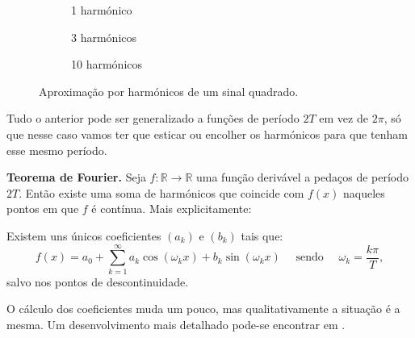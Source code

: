\begin{figure}[h]
\begin{figurebox}
    \vspace{10pt}
    \centering
      \begin{subfigure}{.3\textwidth}
          \centering
          \scalebox{0.25}{ }
          \caption{1 harmónico}
          \label{fig:0a} 
      \end{subfigure} %
      \begin{subfigure}{.3\textwidth}
          \centering
          \scalebox{0.25}{}
          \caption{3 harmónicos}
          \label{fig:0b}
      \end{subfigure} %
      \begin{subfigure}{.3\textwidth}
          \centering
          \scalebox{0.25}{}
          \caption{10 harmónicos}
          \label{fig:0c}
      \end{subfigure}
      \caption{Aproximação por harmónicos de um sinal quadrado.}
      \label{fig:CuadradaAproximaciones}
    
\end{figurebox}
\end{figure}



Tudo o anterior pode ser generalizado a funções de período $2T$ em vez de $2\pi$, só que nesse caso vamos ter que esticar ou encolher os harmónicos para que tenham esse mesmo período. 


\begin{mybox}

\textbf{Teorema de Fourier.} Seja $f:\mathbb{R}\rightarrow \mathbb{R}$ uma função derivável a pedaços de período $2T$. Então existe uma soma de harmónicos que coincide com $f(x)$ naqueles pontos em que $f$ é contínua. Mais explicitamente:

Existem uns únicos coeficientes  $(a_k)$ e $(b_k)$ tais que:
  \begin{equation} \label{eq:RepresentacionFourier2}
    f(x) = a_0 + \sum_{k=1}^\infty a_k\cos(\omega_kx) + b_k\sin(\omega_kx)\quad \text{ sendo }\quad \omega_k = \frac{k \pi}{T},
  \end{equation}
salvo nos pontos de descontinuidade.
\end{mybox}

O cálculo dos coeficientes muda um pouco, mas qualitativamente a situação é a mesma. Um desenvolvimento mais detalhado pode-se encontrar em  \cite{Asmar}.



